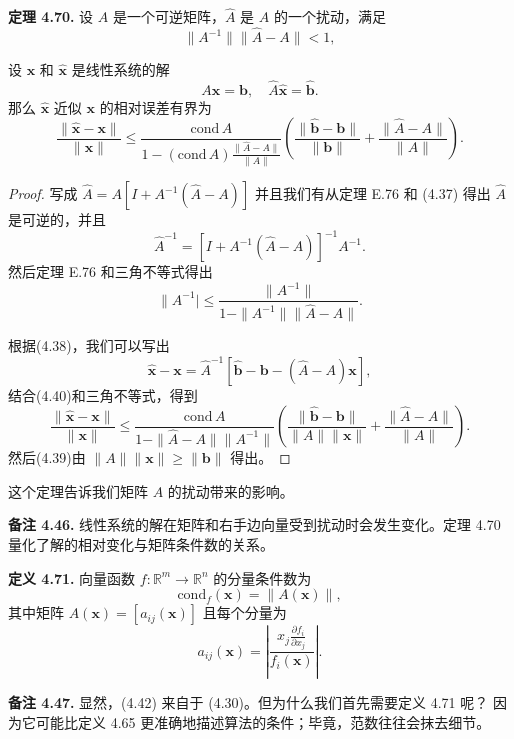 \documentclass[a4paper]{ctexart}
\begin{document}
{\noindent \textbf{定理 4.70.} 设 $A$ 是一个可逆矩阵，$\hat{A}$ 是 $A$ 的一个扰动，满足
\[
\|A^{-1}\|\|\hat{A} - A\| < 1, \tag{4.37}
\]

设 \( \mathbf{x} \) 和 \( \hat{\mathbf{x}} \) 是线性系统的解
\[
A\mathbf{x} = \mathbf{b}, \quad \hat{A}\hat{\mathbf{x}} = \hat{\mathbf{b}}. \tag{4.38}
\]
那么 \( \hat{\mathbf{x}} \) 近似 \( \mathbf{x} \) 的相对误差有界为
\[
  \frac{\|\hat{\mathbf{x}} - \mathbf{x}\|}{\|\mathbf{x}\|} 
  \leq \frac{\text{cond} \, A}{1 - (\text{cond} \, A) \frac{\|\hat{A} - A\|}{\|A\|}} 
  \left( \frac{\|\hat{\mathbf{b}} - \mathbf{b}\|}{\|\mathbf{b}\|} + \frac{\|\hat{A} - A\|}{\|A\|} \right).\tag{4.39}
\]

\begin{proof}
写成 $\hat{A} = A[I + A^{-1}(\hat{A} - A)]$ 并且我们有从定理 E.76 和 (4.37) 得出 $\hat{A}$ 是可逆的，并且
\[
  \hat{A}^{-1} = [I + A^{-1}(\hat{A} - A)]^{-1}A^{-1}.
\]
然后定理 E.76 和三角不等式得出
\[
  \|A^{-1}|\leq \frac{\|A^{-1}\|}{1 - \|A^{-1}\|\|\hat{A} - A\|}.  \tag{4.40}
\]

根据(4.38)，我们可以写出 
\[ 
  \hat{\mathbf{x}} - \mathbf{x} = \hat{A}^{-1}[\hat{\mathbf{b}} - \mathbf{b} - (\hat{A} - A)\mathbf{x}],
\]
结合(4.40)和三角不等式，得到
\[
  \frac{\|\hat{\mathbf{x}} - \mathbf{x}\|}{\|\mathbf{x}\|} \leq \frac{\text{cond} \, A}{1 - \|\hat{A} - A\|\|A^{-1}\|} 
  \left( \frac{\|\hat{\mathbf{b}} - \mathbf{b}\|}{\|A\|\|\mathbf{x}\|} + \frac{\|\hat{A} - A\|}{\|A\|} \right).
\]
然后(4.39)由 \( \|A\|\|\mathbf{x}\| \geq \|\mathbf{b}\| \) 得出。 
\end{proof}


这个定理告诉我们矩阵 $A$ 的扰动带来的影响。

\noindent \textbf{备注 4.46. } 线性系统的解在矩阵和右手边向量受到扰动时会发生变化。定理 4.70 量化了解的相对变化与矩阵条件数的关系。

\noindent \textbf{定义 4.71.} 向量函数 \( f: \mathbb{R}^m \to \mathbb{R}^n \) 的分量条件数为
\[
  \text{cond}_f(\mathbf{x}) = \|A(\mathbf{x})\|, \tag{4.41}
\]
其中矩阵 \( A(\mathbf{x}) = [a_{ij}(\mathbf{x})] \) 且每个分量为
\[
  a_{ij}(\mathbf{x}) = \left| \frac{x_j \frac{\partial f_i}{\partial x_j}}{f_i(\mathbf{x})} \right|. \tag{4.42}
\]

\noindent \textbf{备注 4.47.} 显然，(4.42) 来自于 (4.30)。但为什么我们首先需要定义 4.71 呢？
因为它可能比定义 4.65 更准确地描述算法的条件；毕竟，范数往往会抹去细节。

}
\end{document}
